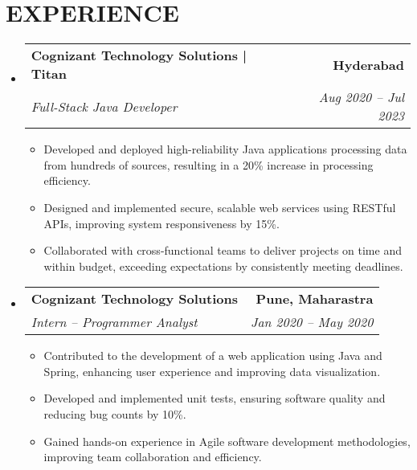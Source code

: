 \documentclass[letterpaper,11pt]{article}
\makeatletter
\newcommand{\resumeItem}[1]{\item\small{{#1 \vspace{-3pt}}}}
\newcommand{\resumeSubheading}[4]{\vspace{-2pt}\item\begin{tabular*}{0.97\textwidth}[t]{l@{\extracolsep{\fill}}r}\textbf{#1} & #2 \\ \textit{\small#3} & \textit{\small #4} \\ \end{tabular*}\vspace{-7pt}}
\newcommand{\resumeSubHeadingListStart}{\begin{itemize}[leftmargin=0.15in, label={}]}
\newcommand{\resumeSubHeadingListEnd}{\end{itemize}}
\newcommand{\resumeItemListStart}{\begin{itemize}}
\newcommand{\resumeItemListEnd}{\end{itemize}\vspace{-5pt}}
\makeatother
\begin{document}
\section{{\fontsize{9pt}{20pt}\selectfont \textbf{EXPERIENCE}}}\resumeSubHeadingListStart
\resumeSubheading{Cognizant Technology Solutions | Titan}{\textbf{Hyderabad}}{Full-Stack Java Developer}{Aug 2020 – Jul 2023}
\resumeItemListStart
\resumeItem{Developed and deployed high-reliability Java applications processing data from hundreds of sources, resulting in a 20\% increase in processing efficiency.}
\resumeItem{Designed and implemented secure, scalable web services using RESTful APIs, improving system responsiveness by 15\%.}
\resumeItem{Collaborated with cross-functional teams to deliver projects on time and within budget, exceeding expectations by consistently meeting deadlines.}
\resumeItemListEnd
\resumeSubheading{Cognizant Technology Solutions}{\textbf{Pune, Maharastra}}{Intern – Programmer Analyst}{Jan 2020 – May 2020}
\resumeItemListStart
\resumeItem{Contributed to the development of a web application using Java and Spring, enhancing user experience and improving data visualization.}
\resumeItem{Developed and implemented unit tests, ensuring software quality and reducing bug counts by 10\%.}
\resumeItem{Gained hands-on experience in Agile software development methodologies, improving team collaboration and efficiency.}
\resumeItemListEnd
\resumeSubHeadingListEnd\vspace{-17pt}
\end{document}
